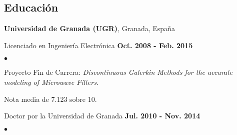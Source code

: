 \documentclass[margin,line]{res}
\newenvironment{list2}{
  \begin{list}{$\bullet$}{%
      \setlength{\itemsep}{0in}
      \setlength{\parsep}{0in} \setlength{\parskip}{0in}
      \setlength{\topsep}{0in} \setlength{\partopsep}{0in} 
      \setlength{\leftmargin}{0.2in}}}{\end{list}}
\begin{document}
\begin{resume}
\section{\sc Educación}
{\bf Universidad de Granada (UGR)}, Granada, España\\
\vspace*{-.1in}
\begin{itemize}
  \item Licenciado en Ingeniería Electrónica \hfill {\bf Oct. 2008 - Feb. 2015}
  \begin{list2}
    \item[-] Proyecto Fin de Carrera: {\it Discontinuous Galerkin Methods for the accurate modeling of Microwave Filters}.
    \item[-] Nota media de 7.123 sobre 10.
  \end{list2}
\vspace*{.1in}
\item Doctor por la Universidad de Granada \hfill {\bf Jul. 2010 - Nov. 2014}
 \begin{list2}
  \vspace*{.05in}
  

\end{list2}
\end{itemize}
\end{resume}
\end{document}
